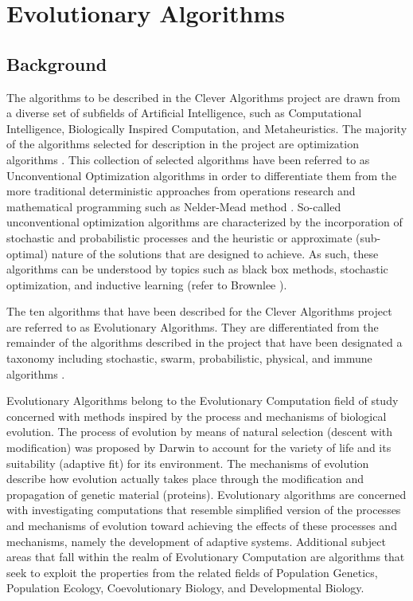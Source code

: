 \documentclass[a4paper, 11pt]{article}
\begin{document}
% 
% 
\section{Evolutionary Algorithms}
\label{sec:algorithms}

% 
% 
\subsection{Background}
The algorithms to be described in the Clever Algorithms project are drawn from a diverse set of subfields of Artificial Intelligence, such as Computational Intelligence, Biologically Inspired Computation, and Metaheuristics. The majority of the algorithms selected for description in the project are optimization algorithms \cite{Brownlee2010b}. 
This collection of selected algorithms have been referred to as Unconventional Optimization algorithms in order to differentiate them from the more traditional deterministic approaches from operations research and mathematical programming such as Nelder-Mead method \cite{Brownlee2010n}. So-called unconventional optimization algorithms are characterized by the incorporation of stochastic and probabilistic processes and the heuristic or approximate (sub-optimal) nature of the solutions that are designed to achieve. As such, these algorithms can be understood by topics such as black box methods, stochastic optimization, and inductive learning (refer to Brownlee \cite{Brownlee2010n}). 

The ten algorithms that have been described for the Clever Algorithms project are referred to as Evolutionary Algorithms. They are differentiated from the remainder of the algorithms described in the project that have been designated a taxonomy including stochastic, swarm, probabilistic, physical, and immune algorithms \cite{Brownlee2010b}. 

Evolutionary Algorithms belong to the Evolutionary Computation field of study concerned with methods inspired by the process and mechanisms of biological evolution. The process of evolution by means of natural selection (descent with modification) was proposed by Darwin to account for the variety of life and its suitability (adaptive fit) for its environment. The mechanisms of evolution describe how evolution actually takes place through the modification and propagation of genetic material (proteins). Evolutionary algorithms are concerned with investigating computations that resemble simplified version of the processes and mechanisms of evolution toward achieving the effects of these processes and mechanisms, namely the development of adaptive systems.
Additional subject areas that fall within the realm of Evolutionary Computation are algorithms that seek to exploit the properties from the related fields of Population Genetics, Population Ecology, Coevolutionary Biology, and Developmental Biology. 
\end{document}
